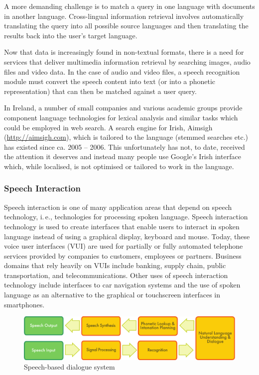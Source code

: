 \begin{multicols}{2}

A more demanding challenge is to match a query in one language with documents in another language. Cross-lingual information retrieval involves automatically translating the query into all possible source languages and then translating the results back into the user's target language.

Now that data is increasingly found in non-textual formats, there is a need for services that deliver multimedia information retrieval by searching images, audio files and video data. In the case of audio and video files, a speech recognition module must convert the speech content into text (or into a phonetic representation) that can then be matched against a user query.

In Ireland, a number of small companies and various academic groups provide component language technologies for lexical analysis and similar tasks which could be employed in web search. A search engine for Irish, Aimsigh (\url{http://aimsigh.com}), which is tailored to the language (stemmed searches etc.) has existed since ca. 2005 -- 2006. This unfortunately has not, to date, received the attention it deserves and instead many people use Google’s Irish interface which, while localised, is not optimised or tailored to work in the language.

\subsubsection{Speech Interaction}

Speech interaction is one of many application areas that depend on speech technology, i.\,e., technologies for processing spoken language. Speech interaction technology is used to create interfaces that enable users to interact in spoken language instead of using a graphical display, keyboard and mouse.  Today, these voice user interfaces (VUI) are used for partially or fully automated telephone services provided by companies to customers, employees or partners. Business domains that rely heavily on VUIs include banking, supply chain, public transportation, and telecommunications. Other uses of speech interaction technology include interfaces to car navigation systems and the use of spoken language as an alternative to the graphical or touchscreen interfaces in smartphones.

\begin{figure}[htb]
  \center
  \includegraphics[width=\textwidth]{../_media/english/simple_speech-based_dialogue_architecture}
  \caption{Speech-based dialogue system}
  \label{fig:dialoguearch_en}
\end{figure}


\end{multicols}
